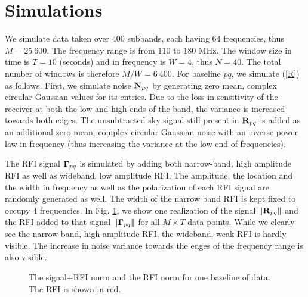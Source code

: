 \documentclass[conference]{IEEEtran}
\def\bmath#1{\mbox{\boldmath$#1$}}
\begin{document}
\section{Simulations}\label{sec:simul}
We simulate data taken over $400$ subbands, each having $64$ frequencies, thus $M=25\ 600$. The frequency range is from $110$ to $180$ MHz. The window size in time is $T=10$ (seconds) and in frequency is $W=4$, thus $N=40$. The total number of windows is therefore $M/W=6\ 400$. For baseline $pq$, we simulate (\ref{R}) as follows. First, we simulate noise ${\bf N}_{pq}$ by generating zero mean, complex circular Gaussian values for its entries. Due to the loss in sensitivity of the receiver at both the low and high ends of the band, the variance is increased towards both edges. The unsubtracted sky signal still present in ${\bf R}_{pq}$ is added as an additional zero mean, complex circular Gaussian noise with an inverse power law in frequency (thus increasing the variance at the low end of frequencies). 

The RFI signal ${\bmath \Gamma}_{pq}$ is simulated by adding both narrow-band, high amplitude RFI as well as wideband, low amplitude RFI. The amplitude, the location and the width in frequency as well as the polarization of each RFI signal are randomly generated as well. The width of the narrow band RFI is kept fixed to occupy $4$ frequencies. In Fig. \ref{vis_rfi}, we show one realization of the signal $\|{\bf R}_{pq}\|$ and the RFI added to that signal $\|{\bmath \Gamma}_{pq}\|$ for all $M\times T$ data points. While we clearly see the narrow-band, high amplitude RFI, the wideband, weak RFI is hardly visible. The increase in noise variance towards the edges of the frequency range is also visible.
\begin{figure}[htbp]
\begin{minipage}[b]{0.98\linewidth}
\centering
\centerline{}
\end{minipage}
\caption{The signal$+$RFI norm and the RFI norm for one baseline of data. The RFI is shown in red.}
\label{vis_rfi}
\end{figure}
\end{document}
